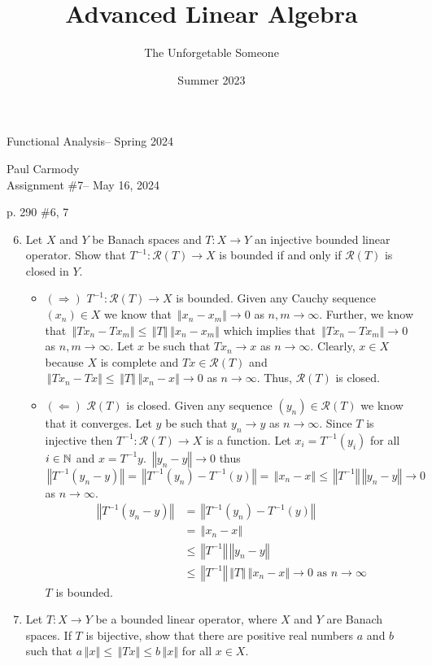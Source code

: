 \documentclass[10pt,a4paper]{report}
\title{Advanced Linear Algebra}
\author{The Unforgetable Someone}
\date{Summer 2023}
\newcommand{\CLASSNAME}{Functional Analysis}
\newcommand{\STUDENTNAME}{Paul Carmody}
\newcommand{\ASSIGNMENT}{Assignment \#7}
\newcommand{\DUEDATE}{May 16, 2024}
\newcommand{\SEMESTER}{Spring 2024}
\newcommand{\NORM}[1]{\,\left \Vert #1 \right \Vert}
\begin{document}
\begin{center}
	\Large{\CLASSNAME -- \SEMESTER} \\
\end{center}
\begin{center}
	\STUDENTNAME \\
	\ASSIGNMENT -- \DUEDATE\\
\end{center} 


p. 290 \#6, 7 
\begin{enumerate}
	\setcounter{enumi}{5}
	\item Let $X$ and $Y$ be Banach spaces and $T: X \to Y$ an injective bounded linear operator.  Show that $T^{-1}:\mathcal{R}(T) \to X$ is bounded if and only if $\mathcal{R}(T)$ is closed in $Y$.
	
	\begin{itemize}
		\item $(\Rightarrow)$ $T^{-1}:\mathcal{R}(T) \to X$ is bounded. Given any Cauchy sequence $(x_n) \in X$ we know that $\NORM{x_n - x_m} \to 0$ as $n,m \to \infty$.  Further, we know that $\NORM{Tx_n-Tx_m} \le \NORM{T}\NORM{x_n - x_m}$ which implies that $\NORM{Tx_n-Tx_m} \to 0$ as $n,m \to \infty$.  Let $x$ be such that $Tx_n \to x$ as $n \to \infty$.  Clearly, $x \in X$ because $X$ is complete and $Tx \in \mathcal{R}(T)$ and $\NORM{Tx_n-Tx} \le \NORM{T}\NORM{x_n-x} \to 0$ as $n \to \infty$.  Thus, $\mathcal{R}(T)$ is closed.
		\item $(\Leftarrow)$ $\mathcal{R}(T)$ is closed.  Given any sequence $(y_n) \in \mathcal{R}(T)$ we know that it converges. Let $y $ be such that $y_n \to y$ as $n\to \infty$.  Since $T$ is injective then $T^{-1}: \mathcal{R}(T) \to X$ is a function.  Let $x_i = T^{-1}(y_i)$ for all $i \in \mathbb{N}$ and $x = T^{-1}y$.  $\NORM{y_n - y} \to 0$ thus $\NORM{T^{-1}(y_n -y)} = \NORM{T^{-1}(y_n)-T^{-1}(y)}= \NORM{x_n - x} \le \NORM{T^{-1}}\NORM{y_n - y} \to 0$ as $n \to \infty$.
		\begin{align*}
			\NORM{T^{-1}(y_n -y)} &= \NORM{T^{-1}(y_n)-T^{-1}(y)} \\
			&= \NORM{x_n - x} \\
			&\le \NORM{T^{-1}}\NORM{y_n - y} \\
			&\le \NORM{T^{-1}}\NORM{T}\NORM{x_n - x} \to 0 \text{ as } n \to \infty
		\end{align*}$T$ is bounded.
	\end{itemize}
	
	\item Let $T: X \to Y$ be a bounded linear operator, where $X$ and $Y$ are Banach spaces.  If $T$ is bijective, show that there are positive real numbers $a$ and $b$ such that $a \NORM{x} \le \NORM{Tx}\le b  \NORM{x}$ for all $ x \in X$.
\end{enumerate}
\end{document}
